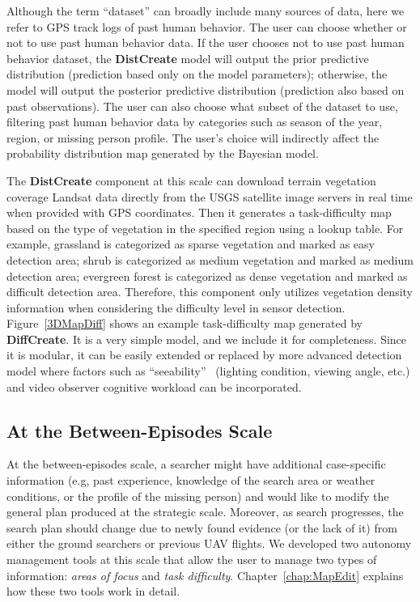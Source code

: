 Although the term ``dataset'' can broadly include many sources of data, here we refer to GPS track logs of past human behavior. The user can choose whether or not to use past human behavior data. If the user chooses not to use past human behavior dataset, the \textbf{DistCreate} model will output the prior predictive distribution (prediction based only on the model parameters); otherwise, the model will output the posterior predictive distribution (prediction also based on past observations). The user can also choose what subset of the dataset to use, filtering past human behavior data by categories such as season of the year, region, or missing person profile. The user's choice will indirectly affect the probability distribution map generated by the Bayesian model.

The \textbf{DistCreate} component at this scale can download terrain vegetation coverage Landsat data directly from the USGS satellite image servers in real time when provided with GPS coordinates. Then it generates a task-difficulty map based on the type of vegetation in the specified region using a lookup table. For example, grassland is categorized as sparse vegetation and marked as easy detection area; shrub is categorized as medium vegetation and marked as medium detection area; evergreen forest is categorized as dense vegetation and marked as difficult detection area. Therefore, this component only utilizes vegetation density information when considering the difficulty level in sensor detection. Figure~\ref{3DMapDiff} shows an example task-difficulty map generated by \textbf{DiffCreate}. It is a very simple model, and we include it for completeness. Since it is modular, it can be easily extended or replaced by more advanced detection model where factors such as ``seeability''~\cite{Morse2010UAV} (lighting condition, viewing angle, etc.) and video observer cognitive workload can be incorporated.

\subsection{At the Between-Episodes Scale}

At the between-episodes scale, a searcher might have additional case-specific information (e.g, past experience, knowledge of the search area or weather conditions, or the profile of the missing person) and would like to modify the general plan produced at the strategic scale. Moreover, as search progresses, the search plan should change due to newly found evidence (or the lack of it) from either the ground searchers or previous UAV flights. We developed two autonomy management tools at this scale that allow the user to manage two types of information: \textit{areas of focus} and \textit{task difficulty}. Chapter~\ref{chap:MapEdit} explains how these two tools work in detail.

